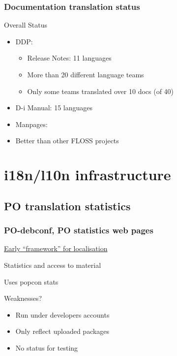 \documentclass{beamer}
\begin{document}
\begin{frame}
  \frametitle{Documentation translation status}
	\begin{block}
		{Overall Status}
		\begin{itemize}
		\item DDP:
		\begin{itemize}
		\item Release Notes: 11 languages
		\item More than 20 different language teams
		\item Only some teams translated over 10 docs (of 40)
		\end{itemize}
		\item D-i Manual: 15 languages
		\item Manpages: 
		\item Better than other FLOSS projects
		\end{itemize}
	\end{block}
\end{frame}


\section{i18n/l10n infrastructure}

\subsection{PO translation statistics}

\begin{frame}
  \frametitle{PO-debconf, PO statistics web pages}
	\begin{block}
		{\href{http://www.debian.org/intl/l10n/po-debconf/fr}{Early ``framework'' for localisation}}
	\end{block}
	\begin{block}
		{Statistics and access to material}
	\end{block}
	\begin{block}
		{Uses popcon stats}
	\end{block}
	\begin{block}
		{Weaknesses?}
		\begin{itemize}
		\item
			Run under developers accounts
		\item
			Only reflect uploaded packages
		\item
			No status for testing
		\end{itemize}
	\end{block}
\end{frame}
	
\end{document}
